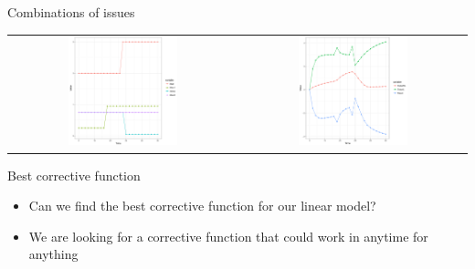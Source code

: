 \documentclass{beamer}
\def\itemizespace{\vspace{7mm}}
\begin{document}
\begin{frame}{Combinations of issues}
	\begin{table}
		\begin{tabular}{ cc }
			\includegraphics[width=0.5\textwidth]{issues_comb_input.png} &
			\includegraphics[width=0.5\textwidth]{issues_comb_output.png} \\
		\end{tabular}
	\end{table}
\end{frame}

\begin{frame}{Best corrective function}
	\begin{itemize}[<+->]
		\item[] Can we find the best corrective function for our linear model?
		\itemizespace%

		\item[] We are looking for a corrective function that could work in
		anytime for anything
		\itemizespace%
	\end{itemize}
\end{frame}
\end{document}

